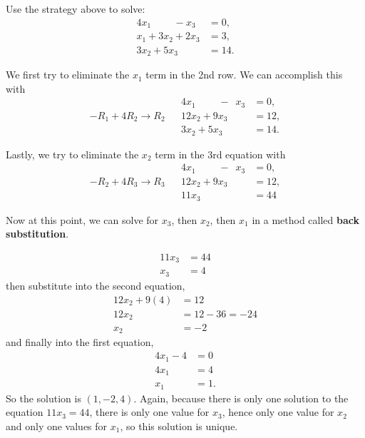 \begin{example} \label{ex:solve:linear:syst}
Use the strategy above to solve:
%
\begin{align*}
4x_1 \phantom{+3x_2}- x_3 & = 0, \\
x_1+3x_2 +2x_3 & = 3, \\
3x_2 + 5x_3 & = 14. 
\end{align*}


\solution

We first try to eliminate the $x_1$ term in the 2nd row.  We can accomplish this with
%
\begin{align*}
&&4x_1  \phantom{+3x_2}-\phantom{9}x_3 & = 0, \\
-R_1+4R_2 \rightarrow R_2 && 12x_2 +9x_3 & = 12, \\
&&3x_2 + 5x_3 & = 14. 
\end{align*}

Lastly, we try to eliminate the $x_2$ term in the 3rd equation with 
%
\begin{align*}
&&4x_1  \phantom{+3x_2}- \phantom{9}x_3 & = 0, \\
-R_2+4R_3 \rightarrow R_3 && 12x_2 +9x_3 & = 12, \\
&& 11x_3 & =  44
\end{align*}

Now at this point, we can solve for $x_3$, then $x_2$, then $x_1$ in a method called \textbf{back substitution}. 

\begin{align*}
11 x_3 & = 44 \\
x_3 & = 4 
\end{align*}
then substitute into the second equation, 
%
\begin{align*}
12x_2 + 9(4) & = 12 \\
12 x_2 & = 12-36=-24 \\
x_2 & = -2 
\end{align*}
and finally into the first equation, 
%
\begin{align*}
4x_1 - 4 & = 0 \\
4x_1 & = 4 \\
x_1 & = 1. 
\end{align*}
So the solution is $(1,-2,4)$.    Again, because there is only one solution to the equation $11x_3=44$, there is only one value for $x_3$, hence only one value for $x_2$ and only one values for $x_1$, so this solution is unique.  
\end{example}

\phantom{Here's some text}


